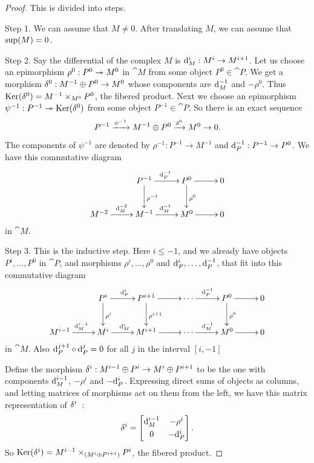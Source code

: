 \begin{proof}
This is divided into steps. 

\smallskip \noindent
Step 1. We can assume that $M \neq 0$. 
After translating $M$, we can assume that $\operatorname{sup}(M) = 0$. 

\medskip \noindent
Step 2. Say the differential of the complex $M$ is 
$\mathrm{d}^{i}_M : M^i \to M^{i + 1}$.
Let us choose an epimorphism $\rho^{0} : P^{0} \twoheadrightarrow M^{0}$ in $\cat{M}$ 
from some object $P^{0} \in \cat{P}$. We get a morphism 
$\delta^{0} :  M^{-1} \oplus P^0 \to M^0$
whose components are $\mathrm{d}^{-1}_M$ and $-\rho^{0}$. Thus 
$\operatorname{Ker}(\delta^{0}) = M^{-1} \times_{M^{0}} P^0$,
the fibered product. 
Next we choose an epimorphism
$\psi^{-1} : P^{-1} \twoheadrightarrow \operatorname{Ker}(\delta^{0})$  
from some object $P^{-1} \in \cat{P}$.
So there is an exact sequence 
\begin{equation} \label{eqn:5060}
P^{-1} \xrightarrow{\psi^{-1}} M^{-1} \oplus P^0 \xrightarrow{\delta^0} M^0 \to 0  .
\end{equation}
The components of $\psi^{-1}$ are denoted by 
$\rho^{-1} : P^{-1} \to  M^{-1}$ and 
$\mathrm{d}_P^{-1} : P^{-1} \to  P^{0}$.
We have this commutative diagram 
\begin{equation} \label{eqn:5058}
\UseTips \xymatrix @C=6ex @R=6ex {
&
P^{-1}
\ar[d]^{\rho^{-1}}
\ar[r]^{\d_P^{-1}}
&
P^0 
\ar[d]^{\rho^0}
\ar[r]
&
0
\\
M^{-2}
\ar[r]^{\d_M^{-2}}
&
M^{-1}
\ar[r]^{\d_M^{-1}}
&
M^0 
\ar[r]
&
0
} 
\end{equation}
in $\cat{M}$.

\medskip \noindent
Step 3. This is the inductive step. Here $i \leq -1$, and we already have 
objects $P^{i}, \ldots, P^0$ in $\cat{P}$, and morphisms 
$\rho^{i}, \ldots, \rho^0$ and $\mathrm{d}_P^{i}, \ldots, \mathrm{d}_P^{-1}$,
that fit into this commutative diagram
\begin{equation} \label{eqn:1745}
\UseTips \xymatrix @C=6ex @R=6ex {
&
P^i
\ar[d]^{\rho^i}
\ar[r]^{\d_P^i}
&
P^{i + 1}
\ar[d]^{\rho^{i + 1}}
\ar[r] 
&
\cdots 
\ar[r]^{\d_P^{-1}}
& 
P^0 
\ar[d]^{\rho^0}
\ar[r]
&
0
\\
M^{i - 1}
\ar[r]^{\d_M^{i - 1}}
&
M^i
\ar[r]^{\d_M^{i}}
&
M^{i + 1}
\ar[r] 
&
\cdots 
\ar[r]^{\d_M^{-1}}
& 
M^0 
\ar[r]
&
0
} 
\end{equation}
in $\cat{M}$. Also 
$\mathrm{d}_P^{j + 1} \circ \mathrm{d}_P^{j} = 0$ for all $j$ in the interval $[i, -1]$

Define the morphism 
$\delta^{i}  :  M^{i - 1} \oplus P^{i} \to  M^{i} \oplus P^{i + 1}$
to be the one with components 
$\mathrm{d}_M^{i - 1}$, $- \rho^i$ and $- \mathrm{d}_P^{i}$.
Expressing direct sums of objects as columns, and letting matrices of morphisms 
act on them from the left, we have this matrix representation of $\delta^i$~:
\begin{equation} \label{eqn:1905}
\delta^i = \begin{bmatrix}  \mathrm{d}_M^{i - 1} & - \rho^i \\[0.3em] 0 & - \mathrm{d}_P^i  \end{bmatrix} .
\end{equation}
So 
$\operatorname{Ker}(\delta^{i}) = M^{i - 1} \times_{(M^i \oplus P^{i + 1})} P^{i}$,
the fibered product. 
 

\end{proof}
